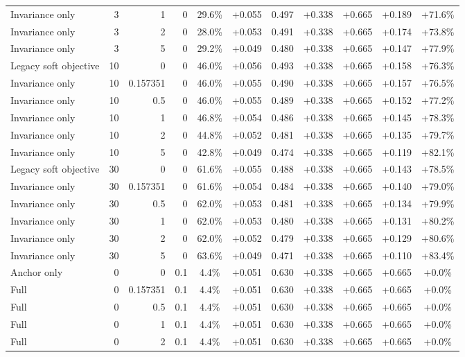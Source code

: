 \begin{table}[htbp]
\begin{tabular}{lrrrccccccc}
Invariance only & 3 & 1 & 0 & 29.6\% & +0.055 & 0.497 & +0.338 & +0.665 & +0.189 & +71.6\% \\
Invariance only & 3 & 2 & 0 & 28.0\% & +0.053 & 0.491 & +0.338 & +0.665 & +0.174 & +73.8\% \\
Invariance only & 3 & 5 & 0 & 29.2\% & +0.049 & 0.480 & +0.338 & +0.665 & +0.147 & +77.9\% \\
Legacy soft objective & 10 & 0 & 0 & 46.0\% & +0.056 & 0.493 & +0.338 & +0.665 & +0.158 & +76.3\% \\
Invariance only & 10 & 0.157351 & 0 & 46.0\% & +0.055 & 0.490 & +0.338 & +0.665 & +0.157 & +76.5\% \\
Invariance only & 10 & 0.5 & 0 & 46.0\% & +0.055 & 0.489 & +0.338 & +0.665 & +0.152 & +77.2\% \\
Invariance only & 10 & 1 & 0 & 46.8\% & +0.054 & 0.486 & +0.338 & +0.665 & +0.145 & +78.3\% \\
Invariance only & 10 & 2 & 0 & 44.8\% & +0.052 & 0.481 & +0.338 & +0.665 & +0.135 & +79.7\% \\
Invariance only & 10 & 5 & 0 & 42.8\% & +0.049 & 0.474 & +0.338 & +0.665 & +0.119 & +82.1\% \\
Legacy soft objective & 30 & 0 & 0 & 61.6\% & +0.055 & 0.488 & +0.338 & +0.665 & +0.143 & +78.5\% \\
Invariance only & 30 & 0.157351 & 0 & 61.6\% & +0.054 & 0.484 & +0.338 & +0.665 & +0.140 & +79.0\% \\
Invariance only & 30 & 0.5 & 0 & 62.0\% & +0.053 & 0.481 & +0.338 & +0.665 & +0.134 & +79.9\% \\
Invariance only & 30 & 1 & 0 & 62.0\% & +0.053 & 0.480 & +0.338 & +0.665 & +0.131 & +80.2\% \\
Invariance only & 30 & 2 & 0 & 62.0\% & +0.052 & 0.479 & +0.338 & +0.665 & +0.129 & +80.6\% \\
Invariance only & 30 & 5 & 0 & 63.6\% & +0.049 & 0.471 & +0.338 & +0.665 & +0.110 & +83.4\% \\
Anchor only & 0 & 0 & 0.1 & 4.4\% & +0.051 & 0.630 & +0.338 & +0.665 & +0.665 & +0.0\% \\
Full & 0 & 0.157351 & 0.1 & 4.4\% & +0.051 & 0.630 & +0.338 & +0.665 & +0.665 & +0.0\% \\
Full & 0 & 0.5 & 0.1 & 4.4\% & +0.051 & 0.630 & +0.338 & +0.665 & +0.665 & +0.0\% \\
Full & 0 & 1 & 0.1 & 4.4\% & +0.051 & 0.630 & +0.338 & +0.665 & +0.665 & +0.0\% \\
Full & 0 & 2 & 0.1 & 4.4\% & +0.051 & 0.630 & +0.338 & +0.665 & +0.665 & +0.0\% \\

\end{tabular}
\end{table}
